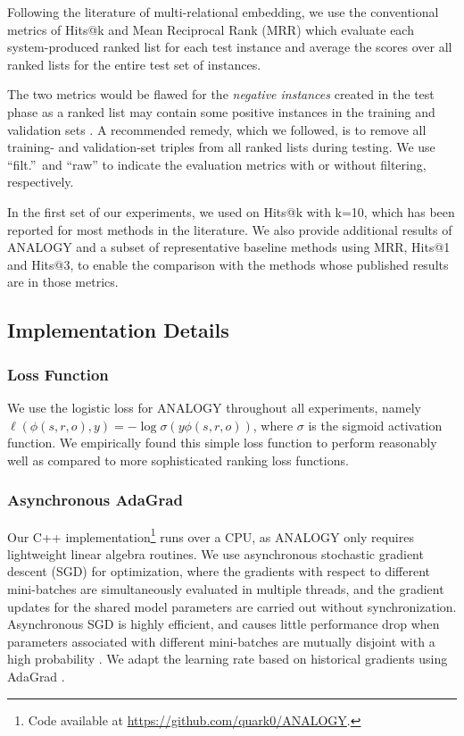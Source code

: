 \documentclass{article}
\begin{document}
Following the literature of multi-relational embedding, we use the conventional metrics of Hits@k and Mean Reciprocal Rank (MRR) which evaluate each system-produced ranked list for each test instance and average the scores over all ranked lists for the entire test set of instances.

The two metrics would be flawed for the \textit{negative instances} created in the test phase as a ranked list may contain some positive instances in the training and validation sets \cite{bordes2013translating}.
A recommended remedy, which we followed, is to remove all training- and validation-set triples from all ranked lists during testing. 
We use ``filt.''\ and ``raw'' to indicate the evaluation metrics with or without filtering, respectively.

In the first set of our experiments,
we used on Hits@k with k=10,
which has been reported for most methods in the literature.  We also provide additional results of ANALOGY and a subset of representative baseline methods using MRR, Hits@1 and Hits@3, to enable the comparison with the methods whose published results are in those metrics.



\subsection{Implementation Details}
\subsubsection{Loss Function}
We use the logistic loss for ANALOGY throughout all experiments, namely
$\ell(\phi(s, r, o), y) = - \log \sigma (y \phi(s, r, o))$,
where $\sigma$ is the sigmoid activation function.
We empirically found this simple loss function to perform reasonably well as compared
to more sophisticated ranking loss functions.

\subsubsection{Asynchronous AdaGrad}
Our C++ implementation\footnote{Code available at \href{https://github.com/quark0/ANALOGY}{https://github.com/quark0/ANALOGY}.} runs over a CPU, as ANALOGY only requires lightweight linear algebra routines.
We use asynchronous stochastic gradient descent (SGD) for optimization,
where the gradients with respect to different mini-batches are simultaneously evaluated in multiple threads,
and the gradient updates for the shared model parameters are carried out without synchronization.
Asynchronous SGD is highly efficient,
and causes little performance drop when parameters associated with different mini-batches are mutually disjoint with a high probability
\cite{recht2011hogwild}.
We adapt the learning rate based on historical gradients
using AdaGrad \cite{duchi2011adaptive}.
\end{document}
